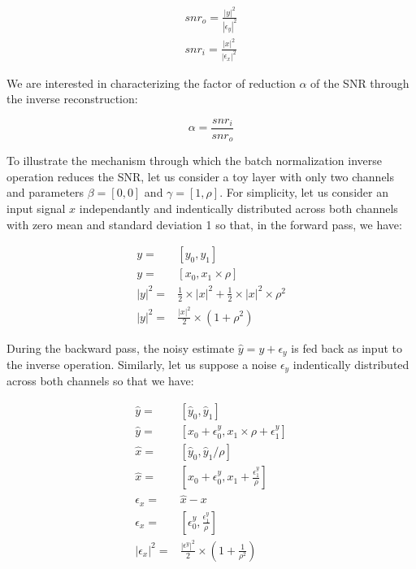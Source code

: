 \documentclass[twocolumn]{bmcart}
\begin{document}
\begin{subequations}
\begin{align}
snr_o = \frac{|y|^2}{|\epsilon_y|^2} \\
snr_i = \frac{|x|^2}{|\epsilon_x|^2}  
\end{align}
\end{subequations}

We are interested in characterizing the factor of reduction $\alpha$ of the SNR through the inverse reconstruction:

\begin{equation}
\alpha = \frac{snr_i}{snr_o}
\end{equation}

To illustrate the mechanism through which the batch normalization inverse operation reduces the SNR, let us consider a toy layer with only two channels and parameters $\beta=[0,0]$ and $\gamma = [1, \rho]$. For simplicity, let us consider an input signal $x$ independantly and indentically distributed across both channels with zero mean and standard deviation 1 so that, in the forward pass, we have:

\begin{subequations}
\begin{align}
 y =& [y_0, y_1] \\
 y =& [x_0, x_1 \times \rho] \\
 |y|^2 =& \frac{1}{2} \times |x|^2 + \frac{1}{2} \times |x|^2 \times \rho^2 \\
 |y|^2 =&\frac{|x|^2}{2} \times (1+\rho^2)
\end{align}
\end{subequations}

During the backward pass, the noisy estimate $\hat{y}=y+\epsilon_y$ is fed back as input to the inverse operation. 
Similarly, let us suppose a noise $\epsilon_y$ indentically distributed across both channels so that we have:

\begin{subequations}
\begin{align}
\hat{y}         =& [ \hat{y}_0, \hat{y}_1 ] \\
\hat{y}         =& [ x_0 + \epsilon_0^y, x_1 \times \rho + \epsilon_1^y ] \\
\hat{x}         =& [ \hat{y}_0, \hat{y}_1 / \rho] \\
\hat{x}         =& [ x_0 + \epsilon_{0}^y, x_1 + \frac{\epsilon_{1}^y}{\rho} ]\\
\epsilon_x      =& \hat{x} - x\\
\epsilon_x      =& [ \epsilon_0^y, \frac{\epsilon_{1}^y}{\rho} ]\\
|\epsilon_x|^2  =& \frac{|\epsilon^y|^2}{2} \times (1 + \frac{1}{\rho^2})
\end{align}
\end{subequations}
\end{document}
